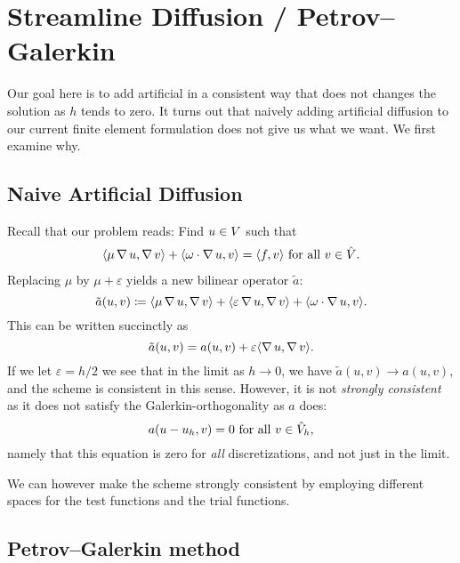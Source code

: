 \section{Streamline Diffusion / Petrov--Galerkin}
\label{sec:streamline_diffusion_petrov_galerkin}

Our goal here is to add artificial in a consistent way that does not changes
the solution as \( h \) tends to zero. It turns out that naively adding
artificial diffusion to our current finite element formulation does not give us
what we want. We first examine why. 

\subsection{Naive Artificial Diffusion}
\label{sub:naive_artificial_diffusion}

Recall that our problem reads: Find \( u \in V\) such that
\begin{align}
    \langle \mu \operatorname{\mathop{}\!\nabla} u, \operatorname{\mathop{}\!\nabla} v \rangle + \langle \omega \cdot \operatorname{\mathop{}\!\nabla} u, v
    \rangle = \langle f, v \rangle \text{ for all } v \in \hat{V}.
\end{align}
Replacing \( \mu \) by \( \mu + \varepsilon \) yields a new bilinear operator \( \tilde{a} \):
\begin{equation}
    \tilde{a}(u, v) \coloneqq \langle \mu \operatorname{\mathop{}\!\nabla} u, \operatorname{\mathop{}\!\nabla} v \rangle + \langle
    \varepsilon \operatorname{\mathop{}\!\nabla} u, \operatorname{\mathop{}\!\nabla} v \rangle + \langle \omega \cdot \operatorname{\mathop{}\!\nabla} u, v
\rangle.
\end{equation}
This can be written succinctly as 
\begin{equation}
    \tilde{a}(u, v) = a(u, v) + \varepsilon \langle \operatorname{\mathop{}\!\nabla} u, \operatorname{\mathop{}\!\nabla} v\rangle.
\end{equation}
If we let \( \varepsilon = h / 2 \) we see that in the limit as \( h \to 0 \),
we have \( \tilde{a}(u, v) \to a(u, v) \), and the scheme is consistent in this
sense. However, it is not \emph{strongly consistent} as it does not satisfy
the Galerkin-orthogonality as \( a \) does: 
\begin{equation}
    a(u - u_h, v) = 0 \text{ for all } v \in \hat{V}_h,
\end{equation}
namely that this equation is zero for \emph{all} discretizations, and not just
in the limit.

We can however make the scheme strongly consistent by employing different
spaces for the test functions and the trial functions.

\subsection{Petrov--Galerkin method}

